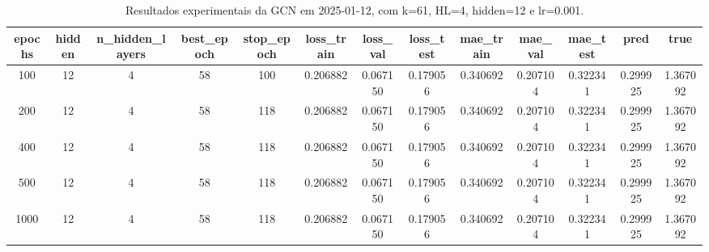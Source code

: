 \begin{table}[h]
\centering
\caption{Resultados experimentais da GCN em 2025-01-12, com k=61, HL=4, hidden=12 e lr=0.001.}
\label{tab:gcn_results_k61_hl4_h12_d20250112}
\begin{tabular}{ccccccccccccc}
\toprule
epochs & hidden & n\_hidden\_layers & best\_epoch & stop\_epoch & loss\_train & loss\_val & loss\_test & mae\_train & mae\_val & mae\_test & pred & true \\
\midrule
100 & 12 & 4 & 58 & 100 & 0.206882 & 0.067150 & 0.179056 & 0.340692 & 0.207104 & 0.322341 & 0.299925 & 1.367092 \\
200 & 12 & 4 & 58 & 118 & 0.206882 & 0.067150 & 0.179056 & 0.340692 & 0.207104 & 0.322341 & 0.299925 & 1.367092 \\
400 & 12 & 4 & 58 & 118 & 0.206882 & 0.067150 & 0.179056 & 0.340692 & 0.207104 & 0.322341 & 0.299925 & 1.367092 \\
500 & 12 & 4 & 58 & 118 & 0.206882 & 0.067150 & 0.179056 & 0.340692 & 0.207104 & 0.322341 & 0.299925 & 1.367092 \\
1000 & 12 & 4 & 58 & 118 & 0.206882 & 0.067150 & 0.179056 & 0.340692 & 0.207104 & 0.322341 & 0.299925 & 1.367092 \\
\bottomrule
\end{tabular}
\end{table}
